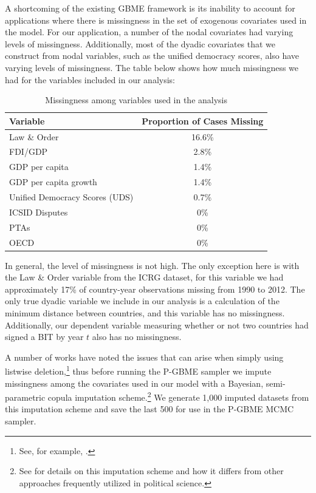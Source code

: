 \documentclass[a4paper, 12pt]{article}
\begin{document}
A shortcoming of the existing GBME framework is its inability to account for applications where there is missingness in the set of exogenous covariates used in the model. For our application, a number of the nodal covariates had varying levels of missingness. Additionally, most of the dyadic covariates that we construct from nodal variables, such as the unified democracy scores, also have varying levels of missingness. The table below shows how much missingness we had for the variables included in our analysis: 

\begin{table}[ht]
  \centering
  \caption{Missingness among variables used in the analysis}
  \begin{tabular}{lc}
  \toprule
  Variable & Proportion of Cases Missing \\
    \midrule
    Law \& Order & 16.6\% \\ 
    FDI/GDP & 2.8\% \\
    GDP per capita & 1.4\% \\
    GDP per capita growth & 1.4\% \\
    Unified Democracy Scores (UDS) & 0.7\% \\
    ICSID Disputes & 0\% \\
    PTAs & 0\% \\   
    OECD & 0\% \\
    \bottomrule
  \end{tabular}
\end{table}
\FloatBarrier

In general, the level of missingness is not high. The only exception here is with the Law \& Order variable from the ICRG dataset, for this variable we had approximately 17\% of country-year observations missing from 1990 to 2012. The only true dyadic variable we include in our analysis is a calculation of the minimum distance between countries, and this variable has no missingness. Additionally, our dependent variable measuring whether or not two countries had signed a BIT by year $t$ also has no missingness. 

A number of works have noted the issues that can arise when simply using listwise deletion,\footnote{See, for example, \citet{king:etal:2001}.} thus before running the P-GBME sampler we impute missingness among the covariates used in our model with a Bayesian, semi-parametric copula imputation scheme.\footnote{See \citet{hoff:2007a,hollenbach:etal:2016a} for details on this imputation scheme and how it differs from other approaches frequently utilized in political science.} We generate 1,000 imputed datasets from this imputation scheme and save the last 500 for use in the P-GBME MCMC sampler.
\end{document}
